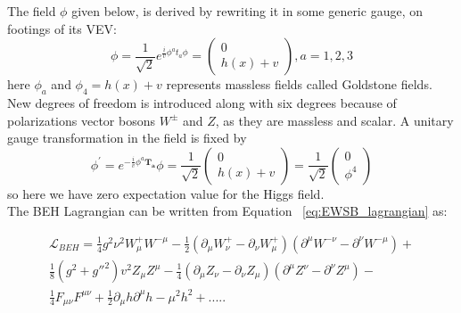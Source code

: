 The field $\phi$ given below, is derived by rewriting it in some generic gauge, on footings of its VEV:
\begin{equation}
 \phi = \frac{1}{\sqrt{2}}e^{\frac{i}{v}\phi^{a}t_{a}\phi}=
  \left(
  \begin{array}{c}
   0   \\
	  h(x)+v
  \end{array}
\right), a=1, 2, 3
\end{equation}
here $\phi_a$ and $\phi_4 = h(x)+v$ represents massless fields called Goldstone fields. New degrees of freedom is introduced
along with six degrees because of polarizations vector bosons $W^\pm$ and $Z$, as they are massless and scalar. A unitary gauge 
transformation in the field is fixed by
$$\phi^{\prime} =  e^{-\frac{i}{v}\phi^{a}\mathbf{T_{a}}}\phi = \frac{1}{\sqrt{2}}
\left(
  \begin{array}{c}
   0   \\
	  h(x)+v
  \end{array}
\right)
= \frac{1}{\sqrt{2}}
  \left(
  \begin{array}{c}
   0   \\
   \phi^4
  \end{array}
\right) $$
so here we have zero expectation value for the Higgs field. \\

The BEH Lagrangian can be written from Equation ~\ref{eq:EWSB_lagrangian} as:

\begin{equation}
\begin{aligned}
\mathscr{L}_{BEH}= \frac{1}{4}g^{2}\nu^{2}W^{+}_{\mu}W^{-\mu}-\frac{1}{2}(\partial_{\mu}W^{+}_{\nu}-\partial_{\nu}W^{+}_{\mu})(\partial^{\mu}W^{-\nu}-\partial^{\nu}W^{-\mu})+ \\
	\frac{1}{8}(g^2+g''^2)v^{2}Z_{\mu}Z^{\mu}-\frac{1}{4}(\partial_{\mu}Z_{\nu}-\partial_{\nu}Z_{\mu})(\partial^{\mu}Z^{\nu}-\partial^{\nu}Z^{\mu})- \\
	\frac{1}{4}F_{\mu\nu}F^{\mu\nu}+\frac{1}{2}\partial_{\mu}h\partial^{\mu}h-\mu^{2}h^{2}+.....
%
\label{eqn:EWSB_lagrangian}
\end{aligned}
\end{equation}

